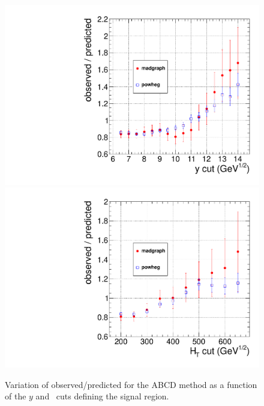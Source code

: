 \begin{figure}[hbt]
\begin{center}
\includegraphics[width=0.48\linewidth]{plots/abcd_y.pdf}
\includegraphics[width=0.48\linewidth]{plots/abcd_ht.pdf}
\caption{\label{fig:abcdvar}\protect Variation of observed/predicted
for the ABCD method as a function of the $y$ and \Ht\ cuts defining
the signal region.}
\end{center}
\end{figure}



